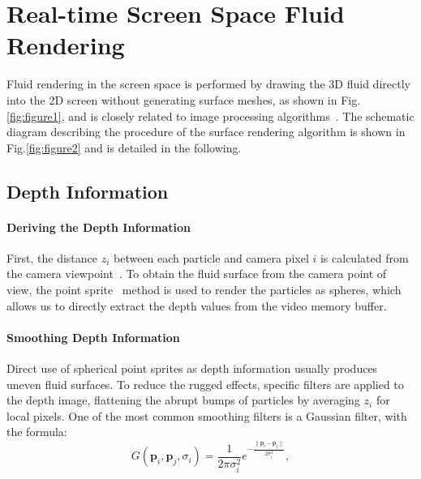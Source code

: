 \documentclass[times,twocolumn,final]{elsarticle}
\begin{document}

\section{Real-time Screen Space Fluid Rendering}
Fluid rendering in the screen space is performed by drawing the 3D fluid directly into the 2D screen without generating surface meshes, as shown in Fig.\ref{fig:figure1}, and is closely related to image processing algorithms~\cite{ref:green2010screen}. The schematic diagram describing the procedure of the surface rendering algorithm is shown in Fig.\ref{fig:figure2} and is detailed in the following.

\subsection{Depth Information}

\paragraph{Deriving the Depth Information}
First, the distance $z_i$ between each particle and camera pixel $i$ is calculated from the camera viewpoint~\cite{ref:ref20}.
To obtain the fluid surface from the camera point of view, the point sprite~\cite{ref:ref21} method is used to render the particles as spheres, which allows us to directly extract the depth values from the video memory buffer.

\paragraph{Smoothing Depth Information}
Direct use of spherical point sprites as depth information usually produces uneven fluid surfaces. To reduce the rugged effects, specific filters are applied to the depth image, flattening the abrupt bumps of particles by averaging $z_i$ for local pixels. One of the most common smoothing filters is a Gaussian filter\cite{ref:ref24}, with the formula:
\begin{equation}
    G\left({\mathbf{p}}_i, {\mathbf{p}}_j, \sigma_i\right)
    =
    \frac{1}{2 \pi \sigma_i^{2}} e^{-\frac{ \| {\mathbf{p}}_i - {\mathbf{p}}_j \| }{2 \sigma_i^{2}}} , 
\label{con:equ2}
\end{equation}
\end{document}
